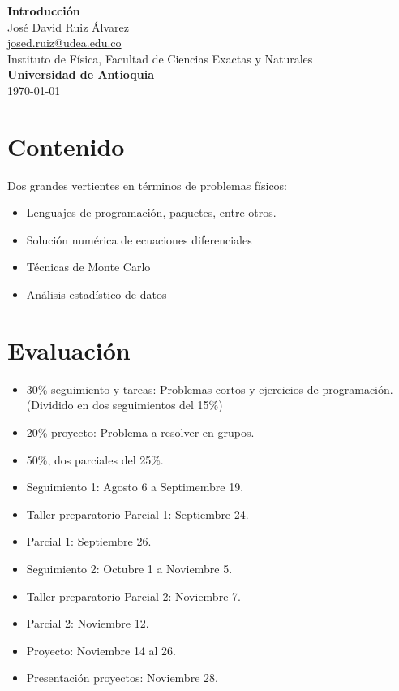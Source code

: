 \documentclass[10.5pt]{article}
\begin{document}
\noindent
\begin{minipage}[b]{0.75\linewidth}
{\LARGE\bf Introducción}\\ %
\large{Jos\'{e} David Ruiz \'{A}lvarez} \\
\small{\href{mailto:josed.ruiz@udea.edu.co}{josed.ruiz@udea.edu.co}} \\ %
\normalsize{Instituto de Física, Facultad de Ciencias Exactas y Naturales} \\%
\normalsize{\bf Universidad de Antioquia} \\[8mm]
\today %
\end{minipage}%

\section{Contenido}

Dos grandes vertientes en t\'{e}rminos de problemas f\'{i}sicos: 
\begin{itemize}
\item Lenguajes de programación, paquetes, entre otros.
\item Solución numérica de ecuaciones diferenciales
\item Técnicas de Monte Carlo
\item Análisis estadístico de datos
\end{itemize}

\section{Evaluación}

\begin{itemize}
\item 30\% seguimiento y tareas: Problemas cortos y ejercicios de programación. (Dividido en dos seguimientos del 15\%)
\item 20\% proyecto: Problema a resolver en grupos.
\item 50\%, dos parciales del 25\%. 
\end{itemize}

\begin{itemize}
\item Seguimiento 1: Agosto 6 a Septimembre 19.
\item Taller preparatorio Parcial 1: Septiembre 24.
\item Parcial 1: Septiembre 26.
\item Seguimiento 2: Octubre 1 a Noviembre 5.
\item Taller preparatorio Parcial 2: Noviembre 7.
\item Parcial 2: Noviembre 12.
\item Proyecto: Noviembre 14 al 26.
\item Presentación proyectos: Noviembre 28.
\end{itemize}
\end{document}

